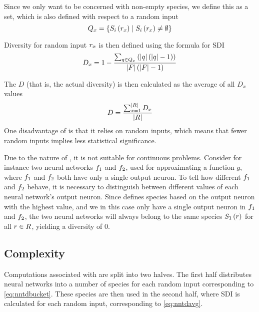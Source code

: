 Since we only want to be concerned with non-empty species, we define this as a set, which is also defined with respect to a random input
\begin{equation*}\label{eq:nonemptyspecies}
  Q_{x} = \left\{ S_{i}\left(r_x\right) \mid S_{i}\left(r_x\right) \neq \emptyset \right\}
\end{equation*}

Diversity for random input $r_x$ is then defined using the formula for SDI\cite{Venturi2007182}
%
\begin{equation*}\label{eq:nntd}
  D_x = 1 - \frac{\sum_{q \in Q_{x}}\left(\lvert q\rvert\left(\lvert q\rvert - 1\right)\right)}{\lvert F\rvert\left(\lvert F\rvert - 1\right)}
\end{equation*}
%

The \dia{} $D$ (that is, the actual diversity) is then calculated as the average of all $D_x$ values
%
\begin{equation}\label{eq:nntdavg}
  D =\frac{\sum_{x=1}^{\lvert R\rvert}{D_x}}{\lvert R\rvert}
\end{equation}
%
One disadvantage of \dia{} is that it relies on random inputs, which means that fewer random inputs implies less statistical significance. 

Due to the nature of \dia, it is not suitable for continuous problems. Consider for instance two neural networks $f_1$ and $f_2$, used for approximating a function $g$, where $f_1$ and $f_2$ both have only a single output neuron. To tell how different $f_1$ and $f_2$ behave, it is necessary to distinguish between different values of each neural network's output neuron. Since \dia{} defines species based on the output neuron with the highest value, and we in this case only have a single output neuron in $f_1$ and $f_2$, the two neural networks will always belong to the same species $S_{1}\left(r\right)$ for all $r \in R$, yielding a diversity of 0.  

\subsection{Complexity}
Computations associated with \dia{} are split into two halves. The first half distributes neural networks into a number of species for each random input corresponding to \cref{eq:nntdbucket}. These species are then used in the second half, where SDI is calculated for each random input, corresponding to \cref{eq:nntdavg}.

